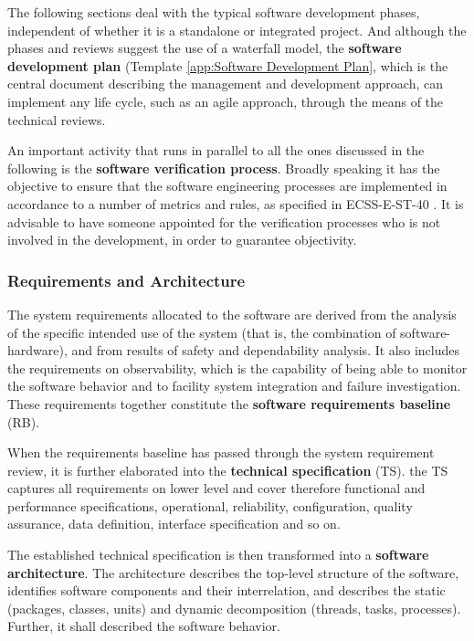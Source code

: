 The following sections deal with the typical software development phases, independent of whether it is a standalone or integrated project. And although the phases and reviews suggest the use of a waterfall model, the \textbf{software development plan} (Template \ref{app:Software Development Plan}, which is the central document describing the management and development approach, can implement any life cycle, such as an agile approach, through the means of the technical reviews.

An important activity that runs in parallel to all the ones discussed in the following is the \textbf{software verification process}. Broadly speaking it has the objective to ensure that the software engineering processes are implemented in accordance to a number of metrics and rules, as specified in ECSS-E-ST-40 \cite{ECSS-E-ST-40}. It is advisable to have someone appointed for the verification processes who is not involved in the development, in order to guarantee objectivity.

\subsubsection{Requirements and Architecture}

The system requirements allocated to the software are derived from the analysis of the specific intended use of the system (that is, the combination of software-hardware), and from results of safety and dependability analysis. It also includes the requirements on observability, which is the capability of being able to monitor the software behavior and to facility system integration and failure investigation. These requirements together constitute the \textbf{software requirements baseline} (RB).

When the requirements baseline has passed through the system requirement review, it is further elaborated into the \textbf{technical specification} (TS). the TS captures all requirements on lower level and cover therefore functional and performance specifications, operational, reliability, configuration, quality assurance, data definition, interface specification and so on.

The established technical specification is then transformed into a \textbf{software architecture}. The architecture describes the top-level structure of the software, identifies software components and their interrelation, and describes the static (packages, classes, units) and dynamic decomposition (threads, tasks, processes). Further, it shall described the software behavior.


